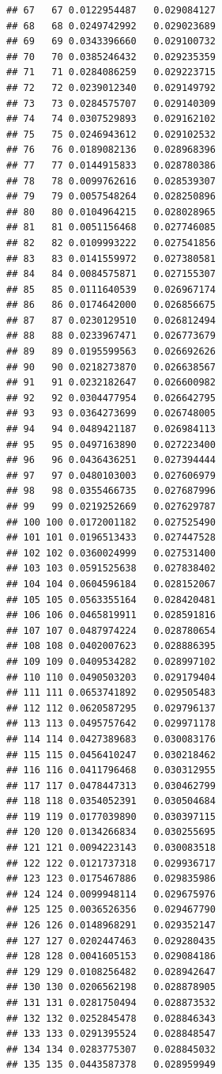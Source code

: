 \documentclass[
]{book}
\begin{document}
\begin{verbatim}
## 67   67 0.0122954487   0.029084127
## 68   68 0.0249742992   0.029023689
## 69   69 0.0343396660   0.029100732
## 70   70 0.0385246432   0.029235359
## 71   71 0.0284086259   0.029223715
## 72   72 0.0239012340   0.029149792
## 73   73 0.0284575707   0.029140309
## 74   74 0.0307529893   0.029162102
## 75   75 0.0246943612   0.029102532
## 76   76 0.0189082136   0.028968396
## 77   77 0.0144915833   0.028780386
## 78   78 0.0099762616   0.028539307
## 79   79 0.0057548264   0.028250896
## 80   80 0.0104964215   0.028028965
## 81   81 0.0051156468   0.027746085
## 82   82 0.0109993222   0.027541856
## 83   83 0.0141559972   0.027380581
## 84   84 0.0084575871   0.027155307
## 85   85 0.0111640539   0.026967174
## 86   86 0.0174642000   0.026856675
## 87   87 0.0230129510   0.026812494
## 88   88 0.0233967471   0.026773679
## 89   89 0.0195599563   0.026692626
## 90   90 0.0218273870   0.026638567
## 91   91 0.0232182647   0.026600982
## 92   92 0.0304477954   0.026642795
## 93   93 0.0364273699   0.026748005
## 94   94 0.0489421187   0.026984113
## 95   95 0.0497163890   0.027223400
## 96   96 0.0436436251   0.027394444
## 97   97 0.0480103003   0.027606979
## 98   98 0.0355466735   0.027687996
## 99   99 0.0219252669   0.027629787
## 100 100 0.0172001182   0.027525490
## 101 101 0.0196513433   0.027447528
## 102 102 0.0360024999   0.027531400
## 103 103 0.0591525638   0.027838402
## 104 104 0.0604596184   0.028152067
## 105 105 0.0563355164   0.028420481
## 106 106 0.0465819911   0.028591816
## 107 107 0.0487974224   0.028780654
## 108 108 0.0402007623   0.028886395
## 109 109 0.0409534282   0.028997102
## 110 110 0.0490503203   0.029179404
## 111 111 0.0653741892   0.029505483
## 112 112 0.0620587295   0.029796137
## 113 113 0.0495757642   0.029971178
## 114 114 0.0427389683   0.030083176
## 115 115 0.0456410247   0.030218462
## 116 116 0.0411796468   0.030312955
## 117 117 0.0478447313   0.030462799
## 118 118 0.0354052391   0.030504684
## 119 119 0.0177039890   0.030397115
## 120 120 0.0134266834   0.030255695
## 121 121 0.0094223143   0.030083518
## 122 122 0.0121737318   0.029936717
## 123 123 0.0175467886   0.029835986
## 124 124 0.0099948114   0.029675976
## 125 125 0.0036526356   0.029467790
## 126 126 0.0148968291   0.029352147
## 127 127 0.0202447463   0.029280435
## 128 128 0.0041605153   0.029084186
## 129 129 0.0108256482   0.028942647
## 130 130 0.0206562198   0.028878905
## 131 131 0.0281750494   0.028873532
## 132 132 0.0252845478   0.028846343
## 133 133 0.0291395524   0.028848547
## 134 134 0.0283775307   0.028845032
## 135 135 0.0443587378   0.028959949

\end{verbatim}
\end{document}

